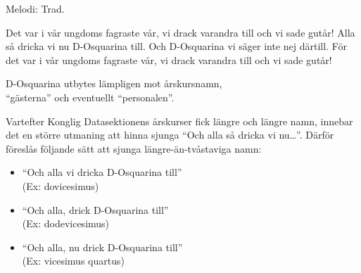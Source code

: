 \begin{song}

\begin{songmeta}
Melodi: Trad.
\end{songmeta}

\begin{songtext}
Det var i vår ungdoms fagraste vår,
vi drack varandra till och vi sade gutår!
Alla så dricka vi nu D-Osquarina till.
Och D-Osquarina vi säger inte nej därtill.
För det var i vår ungdoms fagraste vår,
vi drack varandra till och vi sade gutår!
\end{songtext}

\begin{songnotes}
D-Osquarina utbytes lämpligen mot årskursnamn, \\
\textquotedblleft{}gästerna\textquotedblright{} och eventuellt \textquotedblleft{}personalen\textquotedblright{}.

Vartefter Konglig Datasektionens årskurser fick längre och längre namn, innebar
det en större utmaning att hinna sjunga \textquotedblleft{}Och alla så dricka vi nu\ldots\textquotedblright{}.
Därför föreslås följande sätt att sjunga längre-än-tvåstaviga namn:
\begin{itemize}
\setlength{\itemsep}{0cm}
\setlength{\parskip}{0cm}
\item \textquotedblleft{}Och alla vi dricka D-Osquarina till\textquotedblright{} \\(Ex: dovicesimus)
\item \textquotedblleft{}Och alla, drick D-Osquarina till\textquotedblright{} \\(Ex: dodevicesimus)
\item \textquotedblleft{}Och alla, nu drick D-Osquarina till\textquotedblright{} \\(Ex: vicesimus quartus)
\end{itemize}

\newpage

\end{songnotes}
\end{song}
